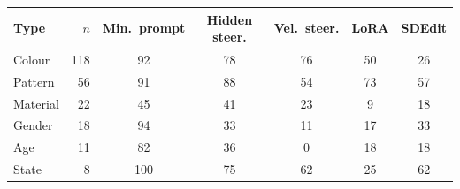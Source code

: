 \begin{tabular}{@{}lrccccc@{}}
\toprule
Type & $n$ & Min.\ prompt & Hidden steer. & Vel.\ steer. & LoRA & SDEdit \\
\midrule
Colour & 118 & 92 & 78 & 76 & 50 & 26 \\
Pattern & 56 & 91 & 88 & 54 & 73 & 57 \\
Material & 22 & 45 & 41 & 23 & 9 & 18 \\
Gender & 18 & 94 & 33 & 11 & 17 & 33 \\
Age & 11 & 82 & 36 & 0 & 18 & 18 \\
State & 8 & 100 & 75 & 62 & 25 & 62 \\
\bottomrule
\end{tabular}